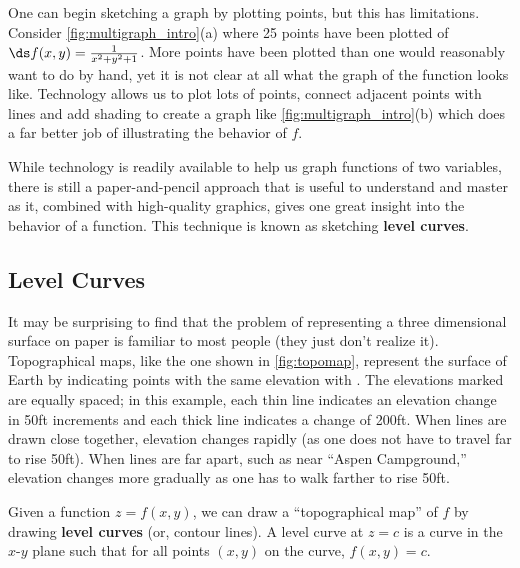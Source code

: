 One can begin sketching a graph by plotting points, but this has limitations. Consider \autoref{fig:multigraph_intro}(a) where 25 points have been plotted of $\ds f(x,y) = \frac1{x^2+y^2+1}$. More points have been plotted than one would reasonably want to do by hand, yet it is not clear at all what the graph of the function looks like. Technology allows us to plot lots of points, connect adjacent points with lines and add shading to create a graph like \autoref{fig:multigraph_intro}(b) which does a far better job of illustrating the behavior of $f$.

While technology is readily available to help us graph functions of two variables, there is still a paper-and-pencil approach that is useful to understand and master as it, combined with high-quality graphics, gives one great insight into the behavior of a function. This technique is known as sketching \textbf{level curves}.

\subsection{Level Curves}

It may be surprising to find that the problem of representing a three dimensional surface on paper is familiar to most people (they just don't realize it). Topographical maps, like the one shown in \autoref{fig:topomap}, represent the surface of Earth by indicating points with the same elevation with . The elevations marked are equally spaced; in this example, each thin line indicates an elevation change in 50ft increments and each thick line indicates a change of 200ft. When lines are drawn close together, elevation changes rapidly (as one does not have to travel far to rise 50ft). When lines are far apart, such as near ``Aspen Campground,'' elevation changes more gradually as one has to walk farther to rise 50ft.


Given a function $z=f(x,y)$, we can draw a ``topographical map'' of $f$ by drawing \textbf{level curves} (or, contour lines). A level curve at $z=c$ is a curve in the $x$-$y$ plane such that for all points $(x,y)$ on the curve, $f(x,y) = c$. 

